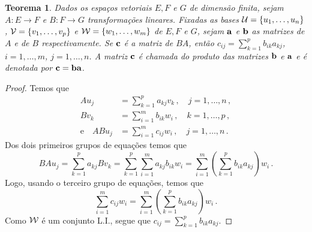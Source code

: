 \documentclass[12pt,a4paper]{article}
\newcommand{\dpar}[1]{\left(#1\right)}
\newtheorem{thm}{Teorema}[section]
\theoremstyle{definition}
\begin{document}
\begin{thm}
  Dados os espaços vetoriais $E, F$ e $G$ de dimensão finita, sejam
  $A:E\to F$ e $B: F\to G$ transformações lineares. Fixadas as bases
  ${\cal U}=\{u_1,\ldots,u_n\}$, ${\cal V}=\{v_1,\ldots,v_p\}$ e
  ${\cal W}=\{w_1,\ldots,w_m\}$ de $E, F$ e $G$, sejam ${\bf a}$ e
  ${\bf b}$ as matrizes de $A$ e de $B$ respectivamente. Se ${\bf c}$
  é a matriz de $BA$, então $c_{ij}=\sum_{k=1}^pb_{ik}a_{kj}$,
  $i=1,\ldots,m$, $j=1,\ldots,n$. A matriz ${\bf c}$ é chamada do
  \emph{produto das matrizes} ${\bf b}$ e ${\bf a}$ e é denotada por
  ${\bf c}={\bf ba}$.
\end{thm}
\begin{proof}
  Temos que
  \begin{equation*}
    \begin{split}
      Au_j&=\sum_{k=1}^pa_{kj}v_k\,,\quad j=1,\ldots,n\,,\\
      Bv_k&=\sum_{i=1}^mb_{ik}w_i\,,\quad k=1,\ldots,p\,,\\
      \text{e}\quad ABu_j&=\sum_{i=1}^mc_{ij}w_i\,,\quad
      j=1,\ldots,n\,.
    \end{split}
  \end{equation*}
  Dos dois primeiros grupos de equações temos que
  $$BAu_j=\sum_{k=1}^pa_{kj}Bv_k=\sum_{k=1}^p\sum_{i=1}^ma_{kj}b_{ik}w_i=\sum_{i=1}^m\dpar{\sum_{k=1}^pb_{ik}a_{kj}}w_i\,.$$
  Logo, usando o terceiro grupo de equações, temos que
  $$\sum_{i=1}^mc_{ij}w_i=\sum_{i=1}^m\dpar{\sum_{k=1}^pb_{ik}a_{kj}}w_i\,.$$
  Como ${\cal W}$ é um conjunto L.I., segue que
  $c_{ij}=\sum_{k=1}^pb_{ik}a_{kj}$.
\end{proof}
\end{document}
